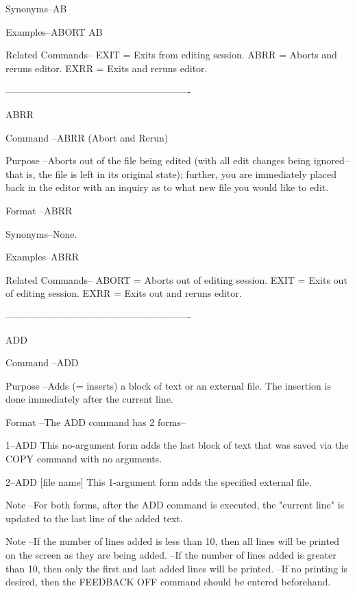 Synonyms--AB
 
Examples--ABORT
          AB
 
Related Commands--
          EXIT            = Exits from editing session.
          ABRR            = Aborts and reruns editor.
          EXRR            = Exits and reruns editor.
 
----------------------------------------------------------
 
 
ABRR
 
Command --ABRR (Abort and Rerun)
 
Purpose --Aborts out of the file being edited
          (with all edit changes being ignored--
          that is, the file is left in its
          original state); further, you are
          immediately placed back in the editor
          with an inquiry as to what new
          file you would like to edit.
 
Format  --ABRR
 
Synonyms--None.
 
Examples--ABRR
 
Related Commands--
          ABORT           = Aborts out of editing session.
          EXIT            = Exits  out of editing session.
          EXRR            = Exits  out and reruns editor.
 
----------------------------------------------------------
 
ADD
 
Command --ADD
 
Purpose --Adds (= inserts) a block of text or
          an external file.  The insertion is done
          immediately after the current line.
 
Format  --The ADD command has 2 forms--
 
       1--ADD
          This no-argument form adds the
          last block of text that was
          saved via the COPY command
          with no arguments.
 
       2--ADD    [file name]
          This 1-argument form adds the
          specified external file.
 
Note    --For both forms, after the ADD command
          is executed, the "current line" is
          updated to the last line of the added text.
 
Note    --If the number of lines added is
          less than 10, then all lines
          will be printed on the screen
          as they are being added.
        --If the number of lines added
          is greater than 10, then only the
          first and last added lines will
          be printed.
        --If no printing is desired, then
          the FEEDBACK OFF command should
          be entered beforehand.
 
